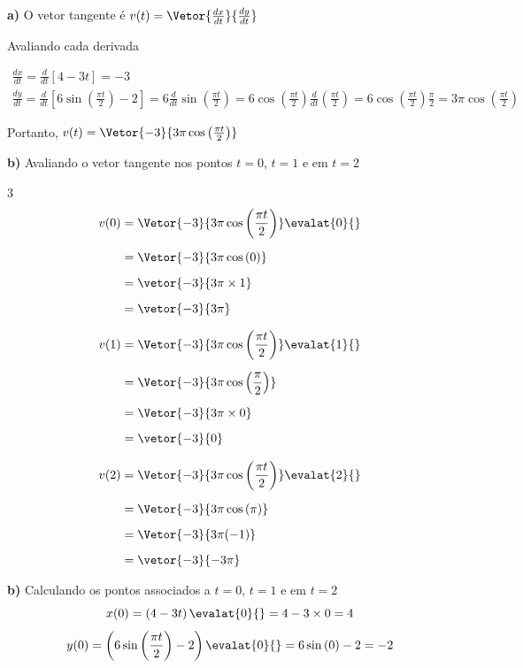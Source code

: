 \documentclass[a4paper,12pt,fleqn]{article}
\begin{document}
\begin{answer}
\textbf{a)} \quad
O vetor tangente é
\(
  v(t) = \Vetor{\frac{dx}{dt}}{\frac{dy}{dt}}
\)

Avaliando cada derivada

\begin{gather*}
\frac{dx}{dt}
  = \frac{d}{dt}\left[4 - 3t\right]
  = -3
  \\[4mm]
\frac{dy}{dt}
  = \frac{d}{dt}\left[6\sin\left(\frac{\pi t}{2}\right) - 2\right]
  = 6\frac{d}{dt}\sin\left(\frac{\pi t}{2}\right)
  = 6\cos\left(\frac{\pi t}{2}\right)\frac{d}{dt}\left(\frac{\pi t}{2}\right)
  = 6\cos\left(\frac{\pi t}{2}\right)\frac{\pi}{2}
  = 3\pi\cos\left(\frac{\pi t}{2}\right)
\end{gather*}

\medskip
Portanto,
\(
  v(t) = \Vetor{-3}{3\pi\cos\left(\frac{\pi t}{2}\right)}
\)

\clearpage
\textbf{b)} \quad
Avaliando o vetor tangente nos pontos $t=0$, $t=1$ e em $t=2$
\begin{multicols}{3}
\setlength{\mathindent}{0pt}
\begin{align*}
  v(0)
  & = \Vetor{-3}{3\pi\cos\left(\frac{\pi t}{2}\right)} \evalat{0}{} \\[2mm]
  & = \Vetor{-3}{3\pi\cos\left(0\right)} \\[2mm]
  & = \vetor{-3}{3\pi\times 1} \\[2mm]
  & = \vetor{-3}{3\pi}
\end{align*}

\newcolumn
\begin{align*}
  v(1)
  & = \Vetor{-3}{3\pi\cos\left(\frac{\pi t}{2}\right)} \evalat{1}{} \\[2mm]
  & = \Vetor{-3}{3\pi\cos\left(\frac{\pi}{2}\right)} \\[2mm]
  & = \Vetor{-3}{3\pi\times 0} \\[2mm]
  & = \vetor{-3}{0}
\end{align*}

\newcolumn
\begin{align*}
  v(2)
  & = \Vetor{-3}{3\pi\cos\left(\frac{\pi t}{2}\right)} \evalat{2}{} \\[2mm]
  & = \Vetor{-3}{3\pi\cos\left(\pi\right)} \\[2mm]
  & = \Vetor{-3}{3\pi(-1)} \\[2mm]
  & = \vetor{-3}{-3\pi}
\end{align*}
\end{multicols}

\bigskip
\textbf{b)} \quad
Calculando os pontos associados a $t=0$, $t=1$ e em $t=2$
\[
  x(0)
  = \left(4 - 3t\right)\evalat{0}{}
  = 4 - 3\times 0
  = 4
\]
\[
  y(0)
  = \left(6\sin\left(\frac{\pi t}{2}\right) - 2\right)\evalat{0}{}
  = 6\sin\left(0\right) - 2
  = -2
\]


\end{answer}
\end{document}
